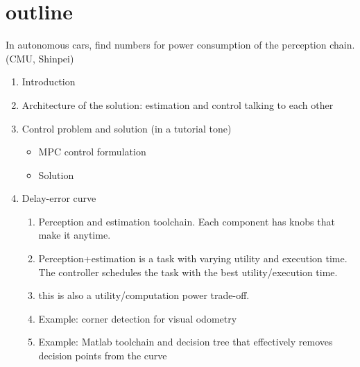 \section{outline}

In autonomous cars, find numbers for power consumption of the perception chain.
(CMU, Shinpei)
\begin{enumerate}
	\item Introduction
	

	\item Architecture of the solution: estimation and control talking to each other
		
	\item Control problem and solution (in a tutorial tone)
	\begin{itemize}
		\item MPC control formulation 
		\item Solution
	\end{itemize}
	
	\item Delay-error curve 
	\begin{enumerate}
		\item Perception and estimation toolchain. Each component has knobs that make it anytime.
		\item Perception+estimation is a task with varying utility and execution time. The controller schedules the task with the best utility/execution time.
		\item this is also a utility/computation power trade-off.
		\item Example: corner detection for visual odometry
		\item Example: Matlab toolchain and decision tree that effectively removes decision points from the curve
	\end{enumerate}
	

\end{enumerate}
